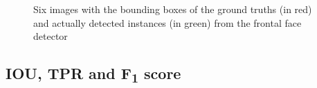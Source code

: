 \documentclass[onecolumn, 11pt, a4paper]{article}
\begin{document}
\begin{figure}[H]
  \hfill
  \caption{Six images with the bounding boxes of the ground truths (in red) and actually detected instances (in green) from the frontal face detector}\label{fig:face}
\end{figure}

\subsection{IOU, TPR and F\textsubscript{1} score}
\end{document}
